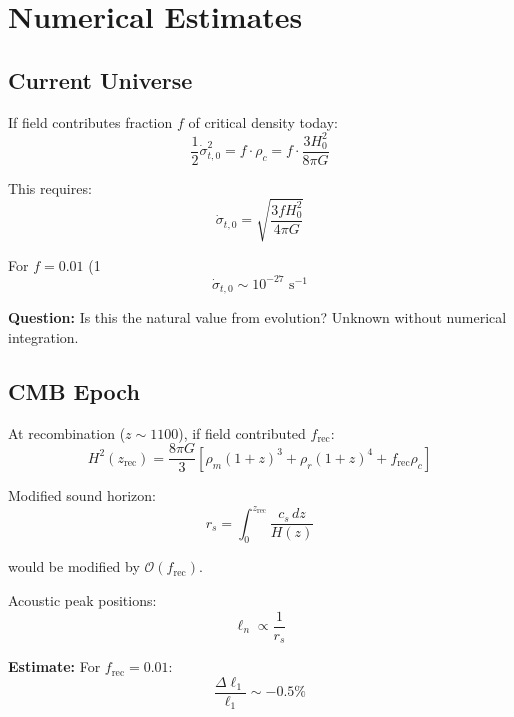 \documentclass[11pt,a4paper]{article}
\theoremstyle{definition}
\theoremstyle{remark}
\begin{document}
	\section{Numerical Estimates}
	
	\subsection{Current Universe}
	
	If field contributes fraction $f$ of critical density today:
	\begin{equation}
		\frac{1}{2}\dot{\sigma}_{t,0}^2 = f \cdot \rho_c = f \cdot \frac{3H_0^2}{8\pi G}
	\end{equation}
	
	This requires:
	\begin{equation}
		\dot{\sigma}_{t,0} = \sqrt{\frac{3fH_0^2}{4\pi G}}
	\end{equation}
	
	For $f = 0.01$ (1%
	\begin{equation}
		\dot{\sigma}_{t,0} \sim 10^{-27} \text{ s}^{-1}
	\end{equation}
	
	\textbf{Question:} Is this the natural value from evolution? Unknown without numerical integration.
	
	\subsection{CMB Epoch}
	
	At recombination ($z \sim 1100$), if field contributed $f_{\text{rec}}$:
	\begin{equation}
		H^2(z_{\text{rec}}) = \frac{8\pi G}{3}\left[\rho_m(1+z)^3 + \rho_r(1+z)^4 + f_{\text{rec}}\rho_c\right]
	\end{equation}
	
	Modified sound horizon:
	\begin{equation}
		r_s = \int_0^{z_{\text{rec}}} \frac{c_s\,dz}{H(z)}
	\end{equation}
	
	would be modified by $\mathcal{O}(f_{\text{rec}})$.
	
	Acoustic peak positions:
	\begin{equation}
		\ell_n \propto \frac{1}{r_s}
	\end{equation}
	
	\textbf{Estimate:} For $f_{\text{rec}} = 0.01$:
	\begin{equation}
		\frac{\Delta \ell_1}{\ell_1} \sim -0.5\%
	\end{equation}
	
\end{document}

